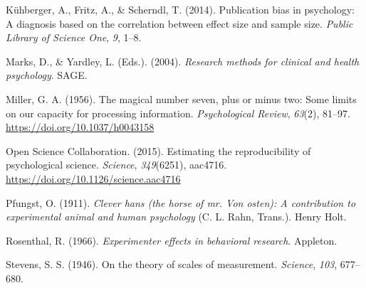 \documentclass[
  11pt,
]{book}
\newlength{\cslhangindent}
\newlength{\cslentryspacingunit} %
\newenvironment{CSLReferences}[2] %
 {%
  \setlength{\parindent}{0pt}
  \ifodd #1
  \let\oldpar\par
  \def\par{\hangindent=\cslhangindent\oldpar}
  \fi
  \setlength{\parskip}{#2\cslentryspacingunit}
 }%
 {}
\theoremstyle{definition}
\theoremstyle{definition}
\theoremstyle{definition}
\theoremstyle{definition}
\theoremstyle{remark}
\begin{document}
\begin{CSLReferences}{1}{0}
\leavevmode{}%
Kühberger, A., Fritz, A., \& Scherndl, T. (2014). Publication bias in psychology: A diagnosis based on the correlation between effect size and sample size. \emph{Public Library of Science One}, \emph{9}, 1--8.

\leavevmode{}%
Marks, D., \& Yardley, L. (Eds.). (2004). \emph{Research methods for clinical and health psychology}. {SAGE}.

\leavevmode{}%
Miller, G. A. (1956). The magical number seven, plus or minus two: {Some} limits on our capacity for processing information. \emph{Psychological Review}, \emph{63}(2), 81--97. \url{https://doi.org/10.1037/h0043158}

\leavevmode{}%
Open Science Collaboration. (2015). Estimating the reproducibility of psychological science. \emph{Science}, \emph{349}(6251), aac4716. \url{https://doi.org/10.1126/science.aac4716}

\leavevmode{}%
Pfungst, O. (1911). \emph{Clever hans (the horse of mr. Von osten): A contribution to experimental animal and human psychology} (C. L. Rahn, Trans.). Henry Holt.

\leavevmode{}%
Rosenthal, R. (1966). \emph{Experimenter effects in behavioral research}. Appleton.

\leavevmode{}%
Stevens, S. S. (1946). On the theory of scales of measurement. \emph{Science}, \emph{103}, 677--680.

\end{CSLReferences}
\end{document}
